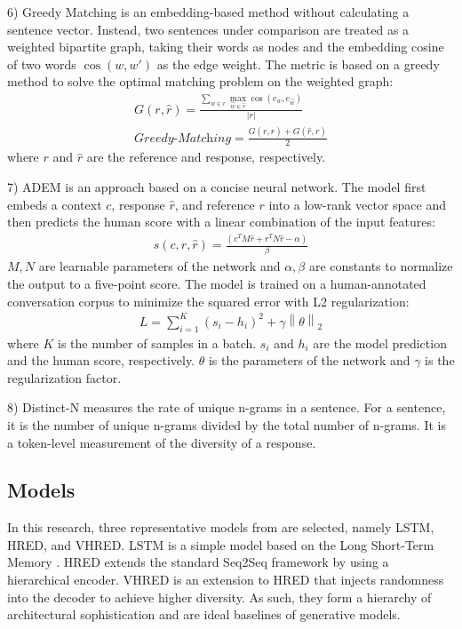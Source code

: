 \documentclass[conference]{IEEEtran}
\begin{document}
6) Greedy Matching \cite{GreedyAndOptimal} is an embedding-based method without calculating a sentence vector.
Instead, two sentences under comparison are treated as a weighted bipartite graph, taking their words as nodes and the embedding cosine of two words $\cos(w, w')$ as the edge weight.
The metric is based on a greedy method to solve the optimal matching problem on the weighted graph:
\begin{align}
    G(r, \hat{r}) = \frac{
    \sum_{w \in r} \max_{\hat{w} \in \hat{r}} \cos(e_w, e_{\hat{w}})
    }{ |r| } \\
    \textit{Greedy-Matching} = \frac{
    G(r, \hat{r}) + G(\hat{r}, r)
    }{2}
\end{align}
where $r$ and $\hat{r}$ are the reference and response, respectively.

7) ADEM \cite{ADEM} is an approach based on a concise neural network.
The model first embeds a context $c$, response $\hat{r}$, and reference $r$ into a low-rank vector space and then predicts the human score with a linear combination of the input features:
\begin{align}
    s(c, r, \hat{r}) = \frac{(c^T M \hat{r} + r^T N \hat{r} - \alpha)}{\beta}
\end{align}
$M, N$ are learnable parameters of the network and $\alpha, \beta$ are constants to normalize the output to a five-point score.
The model is trained on a human-annotated conversation corpus to minimize the squared error with L2 regularization:
\begin{align}
    L = \sum_{i=1}^{K} (s_i - h_i)^2 + \gamma \left\| \theta \right\| _2
\end{align}
where $K$ is the number of samples in a batch.
$s_i$ and $h_i$ are the model prediction and the human score, respectively.
$\theta$ is the parameters of the network and $\gamma$ is the regularization factor.

8) Distinct-N \cite{MMI} measures the rate of unique n-grams in a sentence.
For a sentence, it is the number of unique n-grams divided by the total number of n-grams.
It is a token-level measurement of the diversity of a response.

\subsection{Models}
In this research, three representative models from \cite{VHRED} are selected, namely LSTM, HRED, and VHRED. LSTM is a simple model based on the Long Short-Term Memory \cite{LSTM}.
HRED extends the standard Seq2Seq framework by using a hierarchical encoder.
VHRED is an extension to HRED that injects randomness into the decoder to achieve higher diversity.
As such, they form a hierarchy of architectural sophistication and are ideal baselines of generative models.
\end{document}
